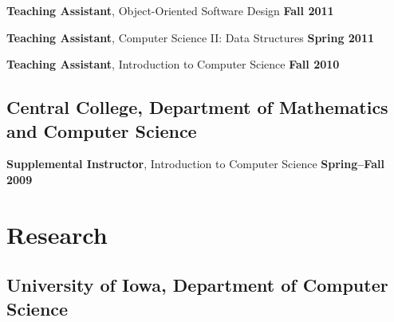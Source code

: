 \documentclass[10pt,letterpaper]{article}
\renewenvironment{itemize}{
  \begin{list}{}{
      \setlength{\leftmargin}{1.5em}
      \setlength{\itemsep}{0.25em}
      \setlength{\parskip}{0pt}
      \setlength{\parsep}{0.25em}
    }
  }{
  \end{list}
}
\begin{document}
\begin{itemize}
\item \textbf{Teaching Assistant}, Object-Oriented Software Design \hfill \textbf{Fall 2011}
\item \textbf{Teaching Assistant}, Computer Science II: Data Structures \hfill \textbf{Spring 2011}
\item \textbf{Teaching Assistant}, Introduction to Computer Science \hfill \textbf{Fall 2010}
\end{itemize}

\subsection*{Central College, Department of Mathematics and
  Computer Science}

\begin{itemize}
\item \textbf{Supplemental Instructor}, Introduction to Computer
  Science \hfill \textbf{Spring--Fall 2009}
\end{itemize}

\pagebreak

\section*{Research}

\subsection*{University of Iowa, Department of Computer Science}
\end{document}
